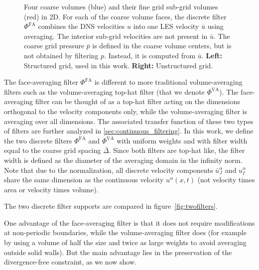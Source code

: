 \documentclass[preprint]{elsarticle}
\newcommand{\R}[1]{}
\newcommand{\revboth}[1]{#1}
\begin{document}
\begin{figure}
    \caption{Four coarse volumes (blue) and their fine grid sub-grid volumes
        (red) in 2D. For each of the coarse volume faces, the discrete filter
        $\Phi^\text{FA}$ combines the DNS velocities $u$ into one LES velocity
        $\bar{u}$ using averaging. The interior sub-grid velocities are not
        present in $\bar{u}$. The coarse grid pressure $\bar{p}$ is defined in
        the coarse volume centers, but is not obtained by filtering $p$.
        Instead, it is computed from $\bar{u}$.
        \textbf{Left:} Structured grid, used in this work.
        \textbf{Right:} Unstructured grid.
    }
    \label{fig:coarsegrid}
\end{figure}

The face-averaging filter $\Phi^\text{FA}$ is different to more traditional
volume-averaging filters such as the volume-averaging top-hat filter
\cite{Sagaut2005} (that we denote $\Phi^\text{VA}$). The face-averaging filter
can be thought of as a top-hat filter acting on the dimensions orthogonal to the
velocity components only, while the volume-averaging filter is averaging over
all dimensions.
\revboth{The associated transfer function of these two types of filters are further analyzed in \ref{sec:continuous_filtering}.}
In this work, we define the two discrete filters
$\Phi^\text{FA}$ and $\Phi^\text{VA}$ with uniform weights and with filter width
equal to the coarse grid spacing $\bar{\Delta}$. Since both filters are top-hat
like, the filter width is defined as the diameter of the averaging domain in the
infinity norm. Note that due to the normalization, all discrete velocity
components $\bar{u}^\alpha_J$ and $u^\alpha_I$ share the same dimension as the
continuous velocity $u^\alpha(x, t)$ (not velocity times area or velocity times
volume).

The two discrete filter supports are compared in figure~\ref{fig:twofilters}.
\R{FA-BC}
One advantage of the face-averaging filter is that it does not require 
modifications at non-periodic boundaries, while the volume-averaging filter does
(for example by using a volume of half the size and twice as large weights to
avoid averaging outside solid walls). But the main advantage lies in the
preservation of the divergence-free constraint, as we now show.
\end{document}
